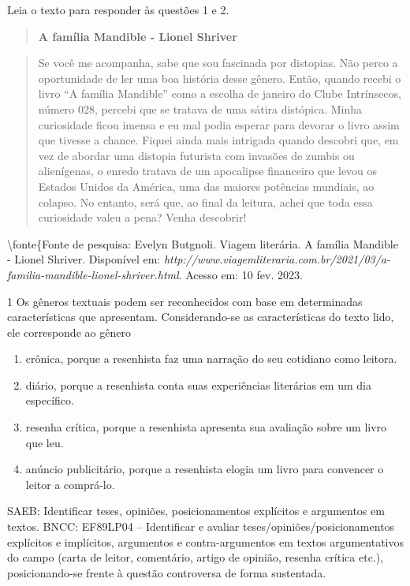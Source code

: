 
Leia o texto para responder às questões 1 e 2.

\begin{quote}
\textbf{A família Mandible - Lionel Shriver}
\end{quote}

\begin{quote}
Se você me acompanha, sabe que sou fascinada por distopias. Não perco a
oportunidade de ler uma boa história desse gênero. Então, quando recebi
o livro ``A família Mandible'' como a escolha de janeiro do Clube
Intrínsecos, número 028, percebi que se tratava de uma sátira distópica.
Minha curiosidade ficou imensa e eu mal podia esperar para devorar o
livro assim que tivesse a chance. Fiquei ainda mais intrigada quando
descobri que, em vez de abordar uma distopia futurista com invasões de
zumbis ou alienígenas, o enredo tratava de um apocalipse financeiro que
levou os Estados Unidos da América, uma das maiores potências mundiais,
ao colapso. No entanto, será que, ao final da leitura, achei que toda
essa curiosidade valeu a pena? Venha descobrir!
\end{quote}

\textbackslash fonte\{Fonte de pesquisa: Evelyn Butgnoli. Viagem
literária. A família Mandible - Lionel Shriver. Disponível em:
\emph{http://www.viagemliteraria.com.br/2021/03/a-familia-mandible-lionel-shriver.html}.
Acesso em: 10 fev. 2023.

\num{1} Os gêneros textuais podem ser reconhecidos com base em
determinadas características que apresentam. Considerando-se as
características do texto lido, ele corresponde ao gênero

\begin{enumerate}
\def\labelenumi{\alph{enumi})}
\item
  crônica, porque a resenhista faz uma narração do seu cotidiano como
  leitora.
\item
  diário, porque a resenhista conta suas experiências literárias em um
  dia específico.
\item
  resenha crítica, porque a resenhista apresenta sua avaliação sobre um
  livro que leu.
\item
  anúncio publicitário, porque a resenhista elogia um livro para
  convencer o leitor a comprá-lo.
\end{enumerate}

SAEB: Identificar teses, opiniões, posicionamentos explícitos e
argumentos em textos. BNCC: EF89LP04 -- Identificar e avaliar
teses/opiniões/posicionamentos explícitos e implícitos, argumentos e
contra-argumentos em textos argumentativos do campo (carta de leitor,
comentário, artigo de opinião, resenha crítica etc.), posicionando-se
frente à questão controversa de forma sustentada.

